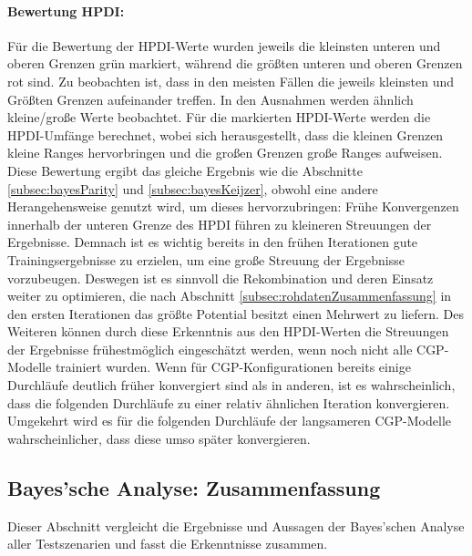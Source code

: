 \paragraph{Bewertung HPDI:}
Für die Bewertung der HPDI-Werte wurden jeweils die kleinsten unteren und oberen Grenzen grün markiert, während die größten unteren und oberen Grenzen rot sind.
Zu beobachten ist, dass in den meisten Fällen die jeweils kleinsten und Größten Grenzen aufeinander treffen.
In den Ausnahmen werden ähnlich kleine/große Werte beobachtet.
Für die markierten HPDI-Werte werden die HPDI-Umfänge berechnet, wobei sich herausgestellt, dass die kleinen Grenzen kleine Ranges hervorbringen und die großen Grenzen große Ranges aufweisen.
Diese Bewertung ergibt das gleiche Ergebnis wie die Abschnitte \ref{subsec:bayesParity} und \ref{subsec:bayesKeijzer}, obwohl eine andere Herangehensweise genutzt wird, um dieses hervorzubringen:
Frühe Konvergenzen innerhalb der unteren Grenze des HPDI führen zu kleineren Streuungen der Ergebnisse.
Demnach ist es wichtig bereits in den frühen Iterationen gute Trainingsergebnisse zu erzielen, um eine große Streuung der Ergebnisse vorzubeugen.
Deswegen ist es sinnvoll die Rekombination und deren Einsatz weiter zu optimieren, die nach Abschnitt \ref{subsec:rohdatenZusammenfassung} in den ersten Iterationen das größte Potential besitzt einen Mehrwert zu liefern.
Des Weiteren können durch diese Erkenntnis aus den HPDI-Werten die Streuungen der Ergebnisse frühestmöglich eingeschätzt werden, wenn noch nicht alle CGP-Modelle trainiert wurden.
Wenn für CGP-Konfigurationen bereits einige Durchläufe deutlich früher konvergiert sind als in anderen, ist es wahrscheinlich, dass die folgenden Durchläufe zu einer relativ ähnlichen Iteration konvergieren.
Umgekehrt wird es für die folgenden Durchläufe der langsameren CGP-Modelle wahrscheinlicher, dass diese umso später konvergieren.


\subsection{Bayes'sche Analyse: Zusammenfassung}
\label{subsec:bayesZusammenfassung}

Dieser Abschnitt vergleicht die Ergebnisse und Aussagen der Bayes'schen Analyse aller Testszenarien und fasst die Erkenntnisse zusammen.
